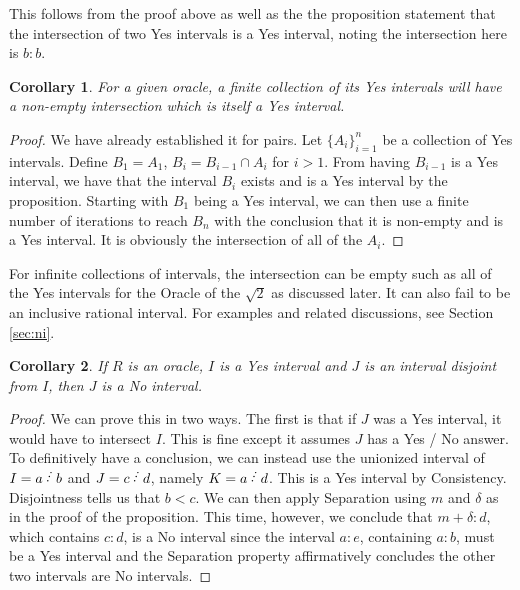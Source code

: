 \documentclass[12pt]{article}
\newtheorem{corollary}{Corollary}[subsection]
\begin{document}
This follows from the proof above as well as the the proposition statement that the intersection of two Yes intervals is a Yes interval, noting the intersection here is $b:b$. 

\begin{corollary}\label{cor:finite-inter}
    For a given oracle, a finite collection of its Yes intervals will have a non-empty intersection which is itself a Yes interval. 
\end{corollary}

\begin{proof}
We have already established it for pairs. Let  $\{A_i\}_{i=1}^n$ be a collection of Yes intervals. Define $B_1 = A_1$, $B_i = B_{i-1} \cap A_i$ for $i > 1$. From having $B_{i-1}$ is a Yes interval, we have that the interval $B_i$ exists and is a Yes interval by the proposition. Starting with $B_1$ being a Yes interval, we can then use a finite number of iterations to reach $B_n$ with the conclusion that it is non-empty and is a Yes interval. It is obviously the intersection of all of the $A_i$.
\end{proof}

For infinite collections of intervals, the intersection can be empty such as all of the Yes intervals for the Oracle of the $\sqrt{2}$ as discussed later. It can also fail to be an inclusive rational interval. For examples and related discussions, see Section \ref{sec:ni}. 

\begin{corollary}\label{cor:disjoint-yes}
    If $R$ is an oracle, $I$ is a Yes interval and $J$ is an interval disjoint from $I$, then $J$ is a No interval. 
\end{corollary}

\begin{proof}
We can prove this in two ways. The first is that if $J$ was a Yes interval, it would have to intersect $I$. This is fine except it assumes $J$ has a Yes / No answer. To definitively have a conclusion, we can instead use the unionized interval of $I= a\lte b$ and $J = c\lte d$, namely $K = a \lte d$. This is a Yes interval by Consistency. Disjointness tells us that $b < c$. We can then apply Separation using $m$ and $\delta$ as in the proof of the proposition. This time, however, we conclude that $m+\delta:d$, which contains $c:d$, is a No interval since the interval $a:e$, containing $a:b$, must be a Yes interval and the Separation property affirmatively concludes the other two intervals are No intervals. 
\end{proof}
\end{document}
